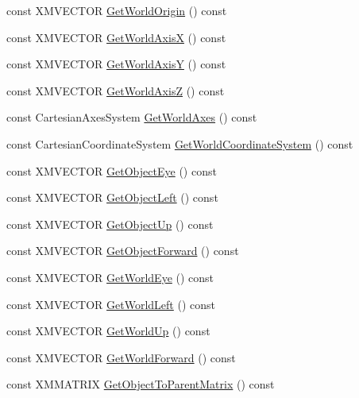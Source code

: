 \begin{DoxyCompactItemize}
const X\+M\+V\+E\+C\+T\+OR \hyperlink{classmage_1_1_transform_node_aba58cc38ebed3fef3bd537fbb09e329a}{Get\+World\+Origin} () const
\item 
const X\+M\+V\+E\+C\+T\+OR \hyperlink{classmage_1_1_transform_node_a138fda019d9d42e483c5e50855e2df9f}{Get\+World\+AxisX} () const
\item 
const X\+M\+V\+E\+C\+T\+OR \hyperlink{classmage_1_1_transform_node_a13b1b983327adec0f2960e4388d2e6a7}{Get\+World\+AxisY} () const
\item 
const X\+M\+V\+E\+C\+T\+OR \hyperlink{classmage_1_1_transform_node_a932c9e84dd8b48d634d7c9f7315100e1}{Get\+World\+AxisZ} () const
\item 
const Cartesian\+Axes\+System \hyperlink{classmage_1_1_transform_node_ae49484fd95f20ada6c6b1100fd681c9c}{Get\+World\+Axes} () const
\item 
const Cartesian\+Coordinate\+System \hyperlink{classmage_1_1_transform_node_ae0347c5fe22cd16da1c6ff727275892d}{Get\+World\+Coordinate\+System} () const
\item 
const X\+M\+V\+E\+C\+T\+OR \hyperlink{classmage_1_1_transform_node_a1a3a2729e417697f0e3a1bb163ed9bb7}{Get\+Object\+Eye} () const
\item 
const X\+M\+V\+E\+C\+T\+OR \hyperlink{classmage_1_1_transform_node_aecea886df8ed9946ab2119ae365315bf}{Get\+Object\+Left} () const
\item 
const X\+M\+V\+E\+C\+T\+OR \hyperlink{classmage_1_1_transform_node_a4d209a7f35df862836c5e2f1badfd968}{Get\+Object\+Up} () const
\item 
const X\+M\+V\+E\+C\+T\+OR \hyperlink{classmage_1_1_transform_node_a2f3c5ea3a0a301181b611b808842c70a}{Get\+Object\+Forward} () const
\item 
const X\+M\+V\+E\+C\+T\+OR \hyperlink{classmage_1_1_transform_node_abbf6b99c7842fa93eb0ebe881abf4b07}{Get\+World\+Eye} () const
\item 
const X\+M\+V\+E\+C\+T\+OR \hyperlink{classmage_1_1_transform_node_a0a53b7d31fab72be41a6a6d789428d09}{Get\+World\+Left} () const
\item 
const X\+M\+V\+E\+C\+T\+OR \hyperlink{classmage_1_1_transform_node_a05d878f235e94b1814b24a790d738ba6}{Get\+World\+Up} () const
\item 
const X\+M\+V\+E\+C\+T\+OR \hyperlink{classmage_1_1_transform_node_a76dbfd8bb65478b3c72e257a67db9791}{Get\+World\+Forward} () const
\item 
const X\+M\+M\+A\+T\+R\+IX \hyperlink{classmage_1_1_transform_node_ae70e7e1ba6cf052397113a5ba90d5e98}{Get\+Object\+To\+Parent\+Matrix} () const

\end{DoxyCompactItemize}
